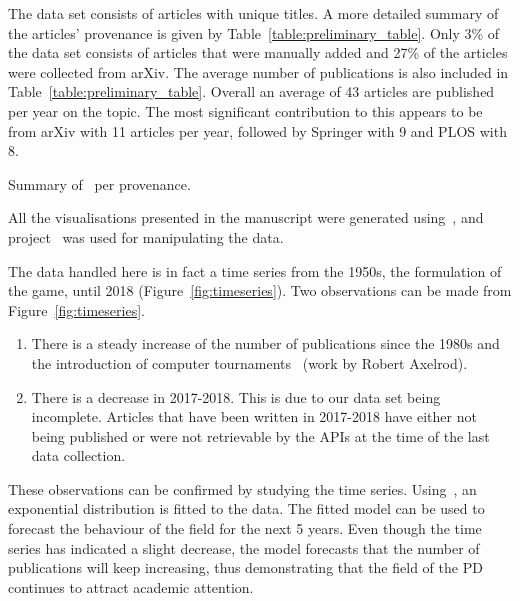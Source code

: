 \documentclass{article}
\theoremstyle{definition}
\newcommand{\totalarticles}{}
\begin{document}
The data set consists of \totalarticles articles with unique
titles. A more detailed summary of the articles' provenance
is given by Table~\ref{table:preliminary_table}. Only 3\% of the data set consists of
articles that were manually added and 27\% of the articles were collected from
arXiv. The average number of publications is also included in
Table~\ref{table:preliminary_table}. Overall an average of 43 articles are published
per year on the topic. The most significant contribution to this appears to be
from arXiv with 11 articles per year, followed by Springer with 9 and PLOS with
8.

\begin{table}[!hbtp]
    \begin{center}
    \resizebox{.9\textwidth}{!}{
    }
    \end{center}
    \caption{Summary of~\cite{pd_data_2018} per provenance.}
    \label{table:preliminary_table}
\end{table}

All the visualisations presented in the manuscript were generated
using~\cite{hunter2007matplotlib}, and project~\cite{walt2011numpy} was used for
manipulating the data.

The data handled here is in fact a time series from the 1950s, the formulation
of the game, until 2018 (Figure~\ref{fig:timeseries}). Two observations can be
made from Figure~\ref{fig:timeseries}.

\begin{enumerate}
    \item There is a steady increase of the number of publications since the
    1980s and the introduction of computer tournaments~\cite{Axelrod1981}
    (work by Robert Axelrod).
    \item There is a decrease in 2017-2018. This is due to our data set being
    incomplete. Articles that have been written in 2017-2018 have either not
    being published or were not retrievable by the APIs at the time of the last
    data collection.
\end{enumerate}

These observations can be confirmed by studying the time series.
Using~\cite{scipy}, an exponential distribution is fitted to the data.
The fitted model can be used to forecast the
behaviour of the field for the next 5 years. Even
though the time series has indicated a slight decrease, the model forecasts that
the number of publications will keep increasing, thus demonstrating that the
field of the PD continues to attract academic attention.
\end{document}
